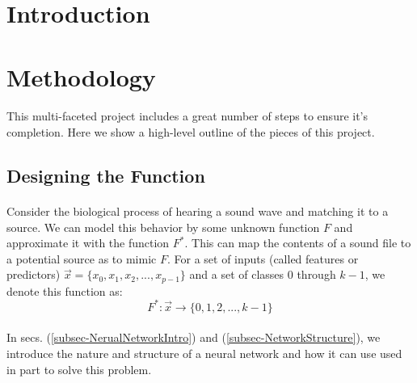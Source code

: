 \documentclass[12pt,letterpaper]{article}
\begin{document}
\section{Introduction}
\label{sec-Introduction}


\newpage
\section{Methodology}
\label{sec-Methodology}

\paragraph*{}This multi-faceted project includes a great number of steps to ensure it's completion. Here we show a high-level outline of the pieces of this project. 


\subsection{Designing the Function}

\paragraph*{}Consider the biological process of hearing a sound wave and matching it to a source. We can model this behavior by some unknown function $F$ and approximate it with the function $F^*$. This can map the contents of a sound file to a potential source as to mimic $F$. For a set of inputs (called features or predictors) $\vec{x} = \big\{ x_0 , x_1 , x_2 , ... , x_{p-1} \big\}$ and a set of classes $0$ through $k-1$, we denote this function as:
\begin{equation}
\label{eqn-MappingFunction}
F^*: \vec{x} \rightarrow \big\{ 0 , 1 , 2 , ... , k-1 \big\}
\end{equation}

\paragraph*{}In secs. (\ref{subsec-NerualNetworkIntro}) and (\ref{subsec-NetworkStructure}), we introduce the nature and structure of a neural network and how it can use used in part to solve this problem.
\end{document}
